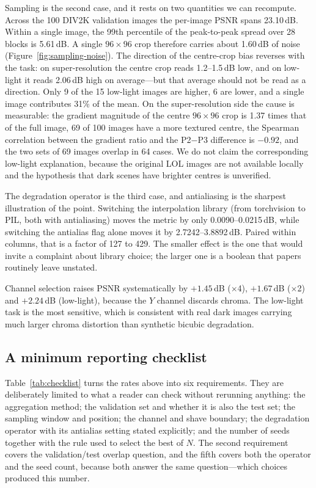 \documentclass[10pt,twocolumn]{article}
\begin{document}
Sampling is the second case, and it rests on two quantities we can
recompute. Across the 100 DIV2K validation images the per-image PSNR spans
23.10\,dB. Within a single image, the 99th percentile of the peak-to-peak
spread over 28 blocks is 5.61\,dB. A single $96\times96$ crop therefore
carries about 1.60\,dB of noise (Figure~\ref{fig:sampling-noise}). The
direction of the centre-crop bias
reverses with the task: on super-resolution the centre crop reads
1.2--1.5\,dB low, and on low-light it reads 2.06\,dB high on average---but
that average should not be read as a direction. Only 9 of the 15 low-light
images are higher, 6 are lower, and a single image contributes 31\% of the
mean. On the super-resolution side the cause is measurable: the gradient
magnitude of the centre $96\times96$ crop is 1.37 times that of the full
image, 69 of 100 images have a more textured centre, the Spearman
correlation between the gradient ratio and the P2$-$P3 difference is $-0.92$,
and the two sets of 69 images overlap in 64 cases. We do not claim the
corresponding low-light explanation, because the original LOL images are
not available locally and the hypothesis that dark scenes have brighter
centres is unverified.

The degradation operator is the third case, and antialiasing is the
sharpest illustration of the point. Switching the interpolation library
(from torchvision to PIL, both with antialiasing) moves the metric by only
0.0090--0.0215\,dB, while switching the antialias flag alone moves it by
2.7242--3.8892\,dB. Paired within columns, that is a factor of 127 to 429.
The smaller effect is the one that would invite a complaint about library
choice; the larger one is a boolean that papers routinely leave unstated.

Channel selection raises PSNR systematically by $+1.45$\,dB ($\times$4),
$+1.67$\,dB ($\times$2) and $+2.24$\,dB (low-light), because the $Y$
channel discards chroma. The low-light task is the most sensitive, which
is consistent with real dark images carrying much larger chroma distortion
than synthetic bicubic degradation.

\subsection{A minimum reporting checklist}

Table~\ref{tab:checklist} turns the rates above into six requirements. They
are deliberately limited to what a reader can check without rerunning
anything: the aggregation method; the validation set and whether it is also
the test set; the sampling window and position; the channel and shave
boundary; the degradation operator with its antialias setting stated
explicitly; and the number of seeds together with the rule used to select
the best of $N$. The second requirement covers the validation/test overlap
question, and the fifth covers both the operator and the seed count, because
both answer the same question---which choices produced this number.
\end{document}
